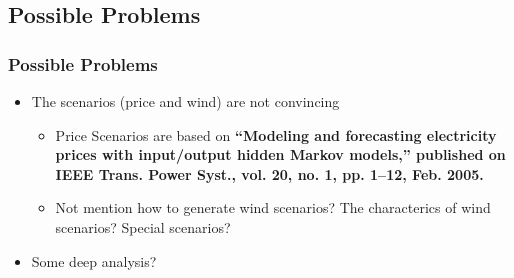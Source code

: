 \subsection{Possible Problems}

\begin{frame}
\frametitle{Possible Problems}

\begin{itemize}
\item The scenarios (price and wind) are not convincing
  \begin{itemize}
  \item Price Scenarios are based on \textbf{``Modeling and forecasting electricity prices with input/output hidden Markov models,'' published on IEEE Trans. Power Syst., vol. 20, no. 1, pp. 1–12, Feb. 2005.}
  \item Not mention how to generate wind scenarios? The characterics of wind scenarios? Special scenarios?
  \end{itemize}
\item Some deep analysis?
\end{itemize}
\end{frame}

